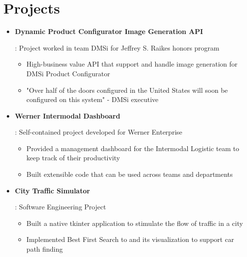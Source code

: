 \documentclass[letterpaper,10pt]{article}
\newcommand{\resumeItem}[2]{
  \item\small{
    \textbf{#1}{: #2 \vspace{-2pt}}
  }
}
\newcommand{\resumeSubItem}[2]{\resumeItem{#1}{#2}\vspace{-4pt}}
\newcommand{\resumeSubHeadingListStart}{\begin{itemize}[leftmargin=*] %
}
\newcommand{\resumeSubHeadingListEnd}{\end{itemize}}
\newcommand{\shorterSection}[1]{\vspace{-10pt}\section{\textcolor{heading-lightblue}{\textbf{\Large #1}}}}
\begin{document}
\shorterSection{Projects}
  \resumeSubHeadingListStart
    \resumeSubItem{Dynamic Product Configurator Image Generation API}
    {Project worked in team DMSi for Jeffrey S. Raikes honors program
        \vspace{-5pt}
        \begin{itemize}
            \item High-business value API that support and handle image generation for DMSi Product Configurator
            \item "Over half of the doors configured in the United States will soon be configured on this system" - DMSi executive
        \end{itemize}
    }
    \resumeSubItem{Werner Intermodal Dashboard}
    {Self-contained project developed for Werner Enterprise
        \vspace{-5pt}
        \begin{itemize}
            \item Provided a management dashboard for the Intermodal Logistic team to keep track of their productivity
            \item Built extensible code that can be used across teams and departments
        \end{itemize}
    }
    \resumeSubItem{City Traffic Simulator}{Software Engineering Project
        \vspace{-5pt}
        \begin{itemize}
            \item Built a native tkinter application to stimulate the flow of traffic in a city
            \item Implemented Best First Search to and its visualization to support car path finding
        \end{itemize}
    }
  \resumeSubHeadingListEnd
\end{document}

